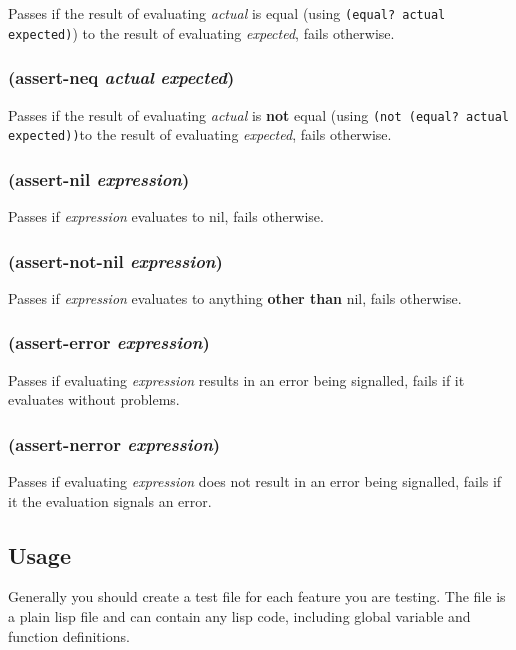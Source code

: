 \documentclass{article}
\begin{document}
Passes if the result of evaluating \emph{actual} is equal (using
\verb|(equal? actual expected)|) to the result of evaluating \emph{expected}, fails otherwise.

\subsubsection{(assert-neq \emph{actual} \emph{expected})}

Passes if the result of evaluating \emph{actual} is \textbf{not} equal (using
\verb|(not (equal? actual expected))|to the result of evaluating \emph{expected}, fails
otherwise.

\subsubsection{(assert-nil \emph{expression})}

Passes if \emph{expression} evaluates to nil, fails otherwise.

\subsubsection{(assert-not-nil \emph{expression})}

Passes if \emph{expression} evaluates to anything \textbf{other than} nil, fails otherwise.

\subsubsection{(assert-error \emph{expression})}

Passes if evaluating \emph{expression} results in an error being signalled, fails if it
evaluates without problems.

\subsubsection{(assert-nerror \emph{expression})}

Passes if evaluating \emph{expression} does not result in an error being signalled, fails if
it the evaluation signals an error.

\subsection{Usage}\label{sec:usage}

Generally you should create a test file for each feature you are testing. The file is a plain
lisp file and can contain any lisp code, including global variable and function definitions.
\end{document}
